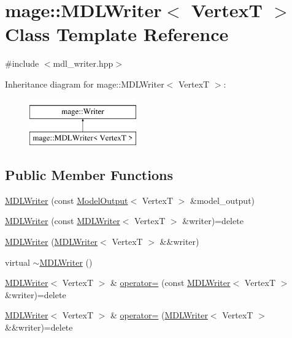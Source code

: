 \hypertarget{classmage_1_1_m_d_l_writer}{}\section{mage\+:\+:M\+D\+L\+Writer$<$ VertexT $>$ Class Template Reference}
\label{classmage_1_1_m_d_l_writer}


{\ttfamily \#include $<$mdl\+\_\+writer.\+hpp$>$}

Inheritance diagram for mage\+:\+:M\+D\+L\+Writer$<$ VertexT $>$\+:\begin{figure}[H]
\begin{center}
\leavevmode
\includegraphics[height=2.000000cm]{classmage_1_1_m_d_l_writer}
\end{center}
\end{figure}
\subsection*{Public Member Functions}
\begin{DoxyCompactItemize}
\item 
\hyperlink{classmage_1_1_m_d_l_writer_a7e5c6c9c9a9d32b09c5e17f4691e01c1}{M\+D\+L\+Writer} (const \hyperlink{structmage_1_1_model_output}{Model\+Output}$<$ VertexT $>$ \&model\+\_\+output)
\item 
\hyperlink{classmage_1_1_m_d_l_writer_ada4bed9d0ad947fd7039cdf9d8cc9698}{M\+D\+L\+Writer} (const \hyperlink{classmage_1_1_m_d_l_writer}{M\+D\+L\+Writer}$<$ VertexT $>$ \&writer)=delete
\item 
\hyperlink{classmage_1_1_m_d_l_writer_a6eedabcade544cc08747535ad36323c4}{M\+D\+L\+Writer} (\hyperlink{classmage_1_1_m_d_l_writer}{M\+D\+L\+Writer}$<$ VertexT $>$ \&\&writer)
\item 
virtual \hyperlink{classmage_1_1_m_d_l_writer_a8ec899d031d513eedf3345b78361d0de}{$\sim$\+M\+D\+L\+Writer} ()
\item 
\hyperlink{classmage_1_1_m_d_l_writer}{M\+D\+L\+Writer}$<$ VertexT $>$ \& \hyperlink{classmage_1_1_m_d_l_writer_a9ea7ddf81f38da846a749a82928e91e9}{operator=} (const \hyperlink{classmage_1_1_m_d_l_writer}{M\+D\+L\+Writer}$<$ VertexT $>$ \&writer)=delete
\item 
\hyperlink{classmage_1_1_m_d_l_writer}{M\+D\+L\+Writer}$<$ VertexT $>$ \& \hyperlink{classmage_1_1_m_d_l_writer_ac2da6334ef4c6c10af7ce5e94ee46dd1}{operator=} (\hyperlink{classmage_1_1_m_d_l_writer}{M\+D\+L\+Writer}$<$ VertexT $>$ \&\&writer)=delete
\end{DoxyCompactItemize}
